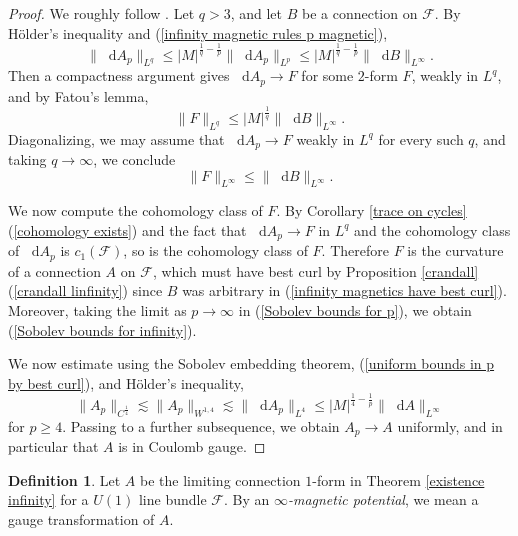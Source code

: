 \documentclass[reqno,11pt]{amsart}
\newcommand*\dif{\mathop{}\!\mathrm{d}}
\newcommand{\dfn}[1]{\emph{#1}\index{#1}}
\theoremstyle{definition}
\newtheorem{definition}[theorem]{Definition}
\numberwithin{equation}{section}
\begin{document}
\begin{proof}
We roughly follow \cite[\S3]{Lindqvist14}.
Let $q > 3$, and let $B$ be a connection on $\mathscr F$.
By H\"older's inequality and (\ref{infinity magnetic rules p magnetic}),
\begin{equation}\label{uniform bounds in p by best curl}
	\|\dif A_p\|_{L^q} \leq |M|^{\frac{1}{q} - \frac{1}{p}} \|\dif A_p\|_{L^p} \leq |M|^{\frac{1}{q} - \frac{1}{p}} \|\dif B\|_{L^\infty}.
\end{equation}
Then a compactness argument gives $\dif A_p \to F$ for some $2$-form $F$, weakly in $L^q$, and by Fatou's lemma, 
$$\|F\|_{L^q} \leq |M|^{\frac{1}{q}} \|\dif B\|_{L^\infty}.$$
Diagonalizing, we may assume that $\dif A_p \to F$ weakly in $L^q$ for every such $q$, and taking $q \to \infty$, we conclude 
\begin{equation}\label{infinity magnetics have best curl}
	\|F\|_{L^\infty} \leq \|\dif B\|_{L^\infty}.
\end{equation}

We now compute the cohomology class of $F$.
By Corollary \ref{trace on cycles}(\ref{cohomology exists}) and the fact that $\dif A_p \to F$ in $L^q$ and the cohomology class of $\dif A_p$ is $c_1(\mathscr F)$, so is the cohomology class of $F$.
Therefore $F$ is the curvature of a connection $A$ on $\mathscr F$, which must have best curl by Proposition \ref{crandall}(\ref{crandall linfinity}) since $B$ was arbitrary in (\ref{infinity magnetics have best curl}).
Moreover, taking the limit as $p \to \infty$ in (\ref{Sobolev bounds for p}), we obtain (\ref{Sobolev bounds for infinity}).

We now estimate using the Sobolev embedding theorem, (\ref{uniform bounds in p by best curl}), and H\"older's inequality,
$$\|A_p\|_{C^{\frac{1}{4}}} \lesssim \|A_p\|_{W^{1, 4}} \lesssim \|\dif A_p\|_{L^4} \leq |M|^{\frac{1}{4} - \frac{1}{p}} \|\dif A\|_{L^\infty}$$
for $p \geq 4$.
Passing to a further subsequence, we obtain $A_p \to A$ uniformly, and in particular that $A$ is in Coulomb gauge.
\end{proof}

\begin{definition}
Let $A$ be the limiting connection $1$-form in Theorem \ref{existence infinity} for a $U(1)$ line bundle $\mathscr F$.
By an \dfn{$\infty$-magnetic potential}, we mean a gauge transformation of $A$.
\end{definition}
\end{document}
